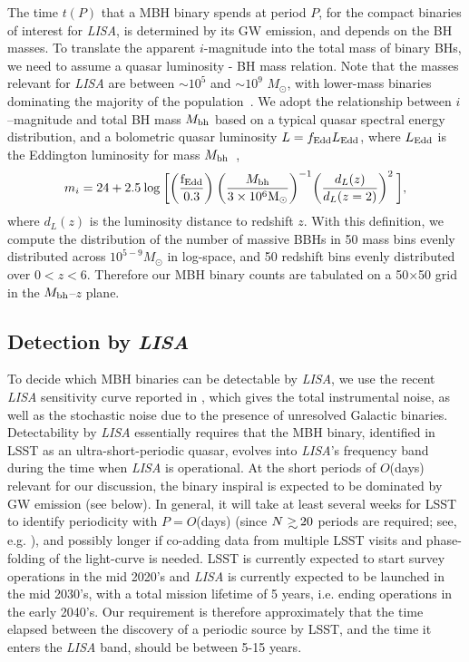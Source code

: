 \documentclass[fleqn,usenatbib]{mnras}
\newcommand\gsim{\mathrel{\rlap{\lower4pt\hbox{\hskip1pt$\sim$}}
        \raise1pt\hbox{$>$}}}
\begin{document}
The time $t(P)$ that a MBH binary spends at period $P$, for the compact binaries of interest for {\it LISA}, is determined by its GW emission, and depends on the BH masses. To translate the apparent $i$-magnitude into the total mass of binary BHs, we need to assume a quasar luminosity - BH mass relation.  Note that the masses relevant for {\it LISA} are between $\sim 10^5$ and $\sim 10^9$ $M_{\odot}$, with lower-mass binaries dominating the majority of the population~\citep[e.g.][and references therein]{Klein+2016}. 
We adopt the relationship between $i$--magnitude and total BH mass $M_{\rm bh}$ based on a typical quasar spectral energy distribution, and a bolometric quasar luminosity $L=f_{\rm Edd} L_{\rm Edd}$, where $L_{\rm Edd}$ is the Eddington luminosity for mass $M_{\rm bh}$~\citep{Haiman2009a},
\begin{equation}  \label{eq:M-imag}
    m_i = 24 + 2.5 \: {\rm log} \: \bigg[ \bigg( \frac{{\rm f}_{\rm Edd}}{0.3}\bigg) \: \bigg( \frac{M_{\rm bh}}{3\times 10^6 {\rm M}_{\odot}}\bigg)^{-1} \bigg( \frac{d_L(z)}{d_L(z=2)}\bigg)^2 \: \bigg],
\end{equation}
%
where $d_L(z)$ is the luminosity distance to redshift $z$. With this definition, we compute the distribution of the number of massive BBHs in 50 mass bins evenly distributed across $10^{5-9}M_{\odot}$ in log-space, and 50 redshift bins evenly distributed over $0<z<6$. Therefore our  MBH binary counts are tabulated on a 50$\times$50 grid in the $M_{\rm bh}$--$z$ plane. 
%

\subsection{Detection by {\it LISA}} \label{sec:lisa_sensitivity}
%
To decide which MBH binaries can be detectable by {\it LISA}, we use
the recent {\it LISA} sensitivity curve reported in \citet{Robson2019}, which gives the total instrumental noise,  as well as the stochastic noise due to the presence of unresolved Galactic binaries. 
Detectability by {\it LISA} essentially requires that the MBH binary, identified in LSST as an ultra-short-periodic quasar, evolves into {\it LISA}'s frequency band during the time when {\it LISA} is operational.  At the short periods of $O$(days) relevant for our discussion, the binary inspiral is expected to be dominated by GW emission (see below).  In general, it will take at least several weeks for LSST to identify periodicity with $P=O$(days) (since $N\gsim 20$ periods are required; see, e.g. \citealt{Vaughan2016}), and possibly longer if co-adding data from multiple LSST visits and phase-folding of the light-curve is needed.  LSST is currently expected to start survey operations in the mid 2020's and {\it LISA} is currently expected to be launched in the mid 2030's, with a total mission lifetime of 5 years, i.e. ending operations in the early 2040's.   Our requirement is therefore approximately that the time elapsed between the discovery of a periodic source by LSST, and the time it enters the {\it LISA} band, should be between 5-15 years.
\end{document}
